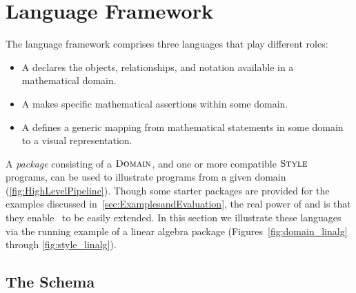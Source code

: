 

\section{Language Framework}
\label{sec:LanguageFramework}

The \Penrose{} language framework comprises three languages that play different roles:

\begin{itemize}
   \item A  declares the objects, relationships, and notation available in a mathematical domain.
   \item A  makes specific mathematical assertions within some domain.
   \item A  defines a generic mapping from mathematical statements in some domain to a visual representation.
\end{itemize}

A \emph{package} consisting of a \(\textsc{Domain}{}\), and one or more compatible \(\textsc{Style}{}\) programs, can be used to illustrate \Substance{} programs from a given domain (\cref{fig:HighLevelPipeline}).  Though some starter packages are provided for the examples discussed in~\cref{sec:ExamplesandEvaluation}, the real power of \Style{} and \Domain{} is that they enable \Penrose\ to be easily extended.  In this section we illustrate these languages via the running example of a linear algebra package (Figures~\ref{fig:domain_linalg} through \ref{fig:style_linalg}).  



\subsection{The \Domain{} Schema}
\label{sec:TheDomainSchema}

